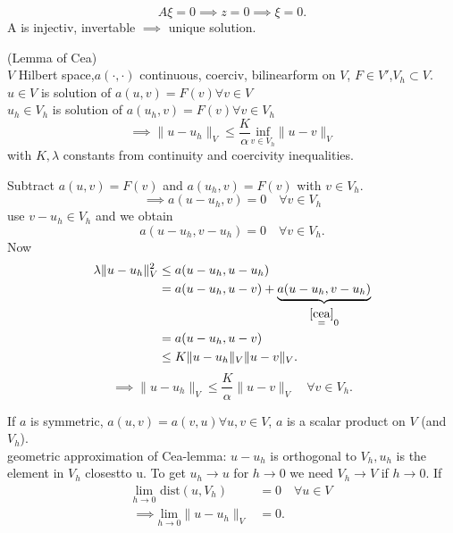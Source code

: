 \begin{equation*}
	A\xi = 0 \implies z=0 \implies \xi = 0.
\end{equation*}
A is injectiv, invertable $\implies$ unique solution.
\begin{lemma_}
	(Lemma of Cea)\\
	$V$ Hilbert space,$a(\cdot,\cdot)$ continuous, coerciv, bilinearform on $V$, $F \in V'$,$V_h \subset V$.\\
	$u\in V$ is solution of $a(u,v) = F(v) \forall v\in V$\\
	$u_h\in V_h$ is solution of $a(u_h,v) = F(v) \forall v\in V_h$\\
	\begin{equation*}
		\implies \|u-u_h\|_V \leq \frac{K}{\alpha}\underset{v \in V_h}{\text{inf}}\|u-v\|_V
	\end{equation*} 
	with $K,\lambda$ constants from continuity and coercivity inequalities.
\end{lemma_}
\begin{proof_}
	Subtract $a(u,v) = F(v)$ and $a(u_h,v) = F(v)$ with $v \in V_h$.
	\begin{equation*}
		\implies a(u-u_h,v)=0\quad \forall v\in V_h
	\end{equation*}
	use $v-u_h \in V_h$ and we obtain
	\begin{equation}\label{cea}
		a(u-u_h,v-u_h)=0\quad \forall v\in V_h.
	\end{equation}
	Now
	\begin{align*}
		\lambda \|u-u_h\|^2_V &\leq a(u-u_h,u-u_h)\\
		&= a(u-u_h,u-v) + \underbrace{a(u-u_h,v-u_h)}_{\overset{\ref{cea}}{=}0}\\
		&= a(u-u_h,u-v)\\
		&\leq K\|u-u_h\|_V\|u-v\|_V.
	\end{align*}
	\begin{equation*}
		\implies \|u-u_h\|_V \leq \frac{K}{\alpha}\|u-v\|_V \quad \forall v\in V_h.
	\end{equation*}
\end{proof_}
If $a$ is symmetric, $a(u,v) = a(v,u) \forall u,v \in V$, $a$ is a scalar product on $V$ (and $V_h$).\\
geometric approximation of Cea-lemma: $u-u_h$ is orthogonal to $V_h,u_h$ is the element in $V_h$ \glqq closest\grqq to u. To get $u_h \to u$ for $h \to 0$ we need $V_h \to V$ if $h\to 0$. If 
\begin{align*}
	\underset{h\to 0}{\text{lim}} \text{ dist}(u,V_h) &= 0 \quad \forall u \in V\\
	\implies \underset{h\to 0}{\text{lim}}\|u-u_h\|_V &=0.
\end{align*}
